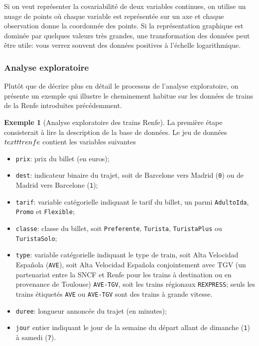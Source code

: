 \documentclass[
  11pt,
  letterpaper,
]{article}
\providecommand{\tightlist}{%
  \setlength{\itemsep}{0pt}\setlength{\parskip}{0pt}}
\theoremstyle{definition}
\theoremstyle{definition}
\newtheorem{example}{Exemple}[section]
\theoremstyle{definition}
\theoremstyle{definition}
\theoremstyle{remark}
\begin{document}
Si on veut représenter la covariabilité de deux variables continues, on utilise un nuage de points où chaque variable est représentée sur un axe et chaque observation donne la coordonnée des points. Si la représentation graphique est dominée par quelques valeurs très grandes, une transformation des données peut être utile: vous verrez souvent des données positives à l'échelle logarithmique.

\hypertarget{analyse-exploratoire-1}{%
\subsubsection{Analyse exploratoire}\label{analyse-exploratoire-1}}

Plutôt que de décrire plus en détail le processus de l'analyse exploratoire, on présente un exemple qui illustre le cheminement habitue sur les données de trains de la Renfe introduites précédemment.

\begin{example}[Analyse exploratoire des trains Renfe]
\protect\hypertarget{exm:renfe-aed}{}\label{exm:renfe-aed}La première étape consisterait à lire la description de la base de données. Le jeu de données \(\\texttt{renfe}\) contient les variables suivantes
\end{example}

\begin{itemize}
\tightlist
\item
  \texttt{prix}: prix du billet (en euros);
\item
  \texttt{dest}: indicateur binaire du trajet, soit de Barcelone vers Madrid (\texttt{0}) ou de Madrid vers Barcelone (\texttt{1});
\item
  \texttt{tarif}: variable catégorielle indiquant le tarif du billet, un parmi \texttt{AdultoIda}, \texttt{Promo} et \texttt{Flexible};
\item
  \texttt{classe}: classe du billet, soit \texttt{Preferente}, \texttt{Turista}, \texttt{TuristaPlus} ou \texttt{TuristaSolo};
\item
  \texttt{type}: variable catégorielle indiquant le type de train, soit Alta Velocidad Española (\texttt{AVE}), soit Alta Velocidad Española conjointement avec TGV (un partenariat entre la SNCF et Renfe pour les trains à destination ou en provenance de Toulouse) \texttt{AVE-TGV}, soit les trains régionaux \texttt{REXPRESS}; seuls les trains étiquetés \texttt{AVE} ou \texttt{AVE-TGV} sont des trains à grande vitesse.
\item
  \texttt{duree}: longueur annoncée du trajet (en minutes);
\item
  \texttt{jour} entier indiquant le jour de la semaine du départ allant de dimanche (\texttt{1}) à samedi (\texttt{7}).
\end{itemize}
\end{document}
